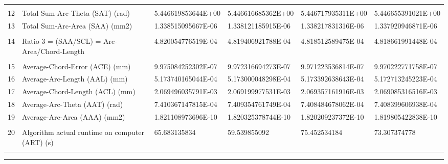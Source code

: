 \begin{landscape}
\begin{table}[ht]
{\begin{tabular}{ p{0.2cm} p{8.80cm} p{4.00cm} p{4.0cm} p{4.00cm} p{4.0cm}}
&		&		&		&		&		\\
12	&	Total Sum-Arc-Theta (SAT) (rad)	&	5.446619853644E+00	&	5.446616685362E+00	&	5.446717935311E+00	&	5.446655391021E+00	\\
13	&	Total Sum-Arc-Area (SAA) (mm2)	&	1.338515095667E-06	&	1.338121185915E-06	&	1.338217831316E-06	&	1.337920946871E-06	\\
&		&		&		&		&		\\
14	&	Ratio 3 = (SAA/SCL) = Arc-Area/Chord-Length	&	4.820054776519E-04	&	4.819406921788E-04	&	4.818512589475E-04	&	4.818661991448E-04	\\
&		&		&		&		&		\\
15	&	Average-Chord-Error (ACE) (mm)	&	9.975084252302E-07	&	9.972316694273E-07	&	9.971223536814E-07	&	9.970222771758E-07	\\
16	&	Average-Arc-Length (AAL) (mm)	&	5.173740165044E-04	&	5.173000048298E-04	&	5.173392638643E-04	&	5.172713245223E-04	\\
17	&	Average-Chord-Length (ACL) (mm)	&	2.069496035791E-03	&	2.069199977531E-03	&	2.069357161916E-03	&	2.069085316516E-03	\\
18	&	Average-Arc-Theta (AAT) (rad)	&	7.410367147815E-04	&	7.409354761749E-04	&	7.408484678062E-04	&	7.408399606938E-04	\\
19	&	Average-Arc-Area (AAA) (mm2)	&	1.821108973696E-10	&	1.820325378744E-10	&	1.820209237372E-10	&	1.819805422838E-10	\\
&		&		&		&		&		\\
20	&	Algorithm actual runtime on computer (ART) (s) 	&	65.683135834	&	59.539855092	&	75.452534184	&	73.307374778	\\
&		&		&		&		&		

\end{tabular}
			
}   %
\hrule
\end{table}
\end{landscape}

